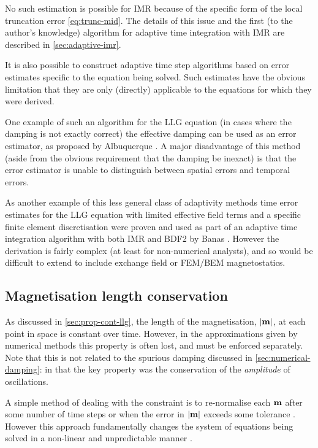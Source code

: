 No such estimation is possible for IMR because of the specific form of the local truncation error \eqref{eq:trunc-mid}.
The details of this issue and the first (to the author's knowledge) algorithm for adaptive time integration with IMR are described in \cref{sec:adaptive-imr}.

It is also possible to construct adaptive time step algorithms based on error estimates specific to the equation being solved.
Such estimates have the obvious limitation that they are only (directly) applicable to the equations for which they were derived.

One example of such an algorithm for the LLG equation (in cases where the damping is not exactly correct) the effective damping can be used as an error estimator, as proposed by Albuquerque \etal \cite{Albuquerque2001}.
A major disadvantage of this method (aside from the obvious requirement that the damping be inexact) is that the error estimator is unable to distinguish between spatial errors and temporal errors.

As another example of this less general class of adaptivity methods time error estimates for the LLG equation with limited effective field terms and a specific finite element discretisation were proven and used as part of an adaptive time integration algorithm with both IMR and BDF2 by Banas \cite{Banas-thesis}.
However the derivation is fairly complex (at least for non-numerical analysts), and so would be difficult to extend to include exchange field or FEM/BEM magnetostatics.


\subsection{Magnetisation length conservation}
\label{sec:ensuring-constant-mv}

As discussed in \cref{sec:prop-cont-llg}, the length of the magnetisation, $\left|{\mathbf{m}} \right|$, at each point in space is constant over time.
However, in the approximations given by numerical methods this property is often lost, and must be enforced separately.
Note that this is not related to the spurious damping discussed in \cref{sec:numerical-damping}: in that  the key property was the conservation of the \emph{amplitude} of oscillations.

A simple method of dealing with the constraint is to re-normalise each $\mathbf{m}$ after some number of time steps or when the error in $\left|{\mathbf{m}} \right|$ exceeds some tolerance \cite{Fidler2000}.
However this approach fundamentally changes the system of equations being solved in a non-linear and unpredictable manner \cite{Lewis2003}.

